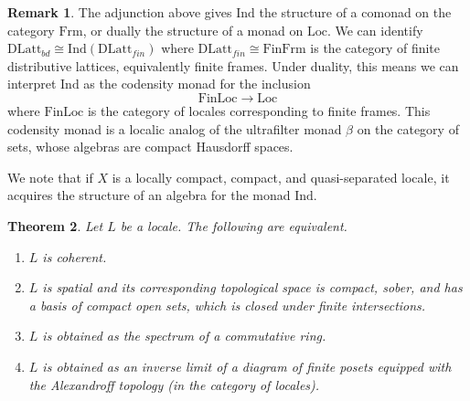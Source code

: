 \documentclass[10pt]{amsart}
\newtheorem{theorem}{Theorem}[section]
\theoremstyle{definition}
\newtheorem{remark}[theorem]{Remark}
\begin{document}
\begin{remark} The adjunction above gives $\mathrm{Ind}$ the structure of a comonad on the category $\mathrm{Frm}$, or dually the structure of a monad on $\mathrm{Loc}$. We can identify $\mathrm{DLatt}_{bd} \cong \mathrm{Ind}(\mathrm{DLatt}_{fin})$ where $\mathrm{DLatt}_{fin} \cong \mathrm{FinFrm}$ is the category of finite distributive lattices, equivalently finite frames. Under duality, this means we can interpret $\mathrm{Ind}$ as the codensity monad for the inclusion
$$\mathrm{FinLoc} \rightarrow \mathrm{Loc}$$
where $\mathrm{FinLoc}$ is the category of locales corresponding to finite frames. This codensity monad is a localic analog of the ultrafilter monad $\beta$ on the category of sets, whose algebras are compact Hausdorff spaces. \cite{leinster2013codensityultrafiltermonad}

We note that if $X$ is a locally compact, compact, and quasi-separated locale, it acquires the structure of an algebra for the monad $\mathrm{Ind}$. \cite[Section 3.3]{anel_lejay_exponentiable}
\end{remark}

\begin{theorem} Let $L$ be a locale. The following are equivalent.
\begin{enumerate}
\item $L$ is coherent.
\item $L$ is spatial and its corresponding topological space is compact, sober, and has a basis of compact open sets, which is closed under finite intersections.
\item $L$ is obtained as the spectrum of a commutative ring.
\item $L$ is obtained as an inverse limit of a diagram of finite posets equipped with the Alexandroff topology (in the category of locales).
\end{enumerate}
\end{theorem}
\end{document}
